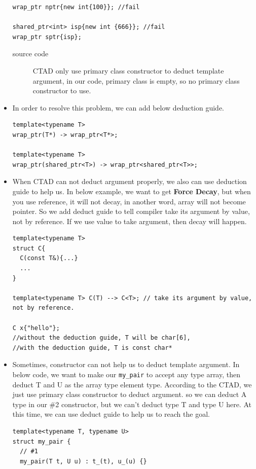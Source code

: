 \documentclass[a4paper,11pt,twoside]{book}
\begin{document}
\begin{itemize}
\begin{lstlisting}
wrap_ptr nptr{new int{100}}; //fail

shared_ptr<int> isp{new int {666}}; //fail
wrap_ptr sptr{isp};
\end{lstlisting}

\begin{description}
    \item[source code] CTAD only use primary class constructor to deduct template argument, in our code, primary class is empty, so no primary class constructor to use.
\end{description}

    \item In order to resolve this problem, we can add below deduction guide.

\begin{lstlisting}
template<typename T>
wrap_ptr(T*) -> wrap_ptr<T*>;

template<typename T>
wrap_ptr(shared_ptr<T>) -> wrap_ptr<shared_ptr<T>>;
\end{lstlisting}


        \item When CTAD can not deduct argument properly, we also can use deduction guide to help us. In below example, we want to get \textbf{Force Decay}, but when you use reference, it will not decay, in another word, array will not become pointer. So we add deduct guide to tell compiler take its argument by value, not by reference. If we use value to take argument, then decay will happen.
\begin{lstlisting}
template<typename T>
struct C{
  C(const T&){...}
  ...
}

template<typename T> C(T) --> C<T>; // take its argument by value, not by reference.

C x{"hello"};
//without the deduction guide, T will be char[6],
//with the deduction guide, T is const char*
\end{lstlisting}

    \item Sometimes, constructor can not help us to deduct template argument. In below code, we want to make our \texttt{my\_pair} to accept any type array, then deduct T and U as the array type element type. According to the CTAD, we just use primary class constructor to deduct argument. so we can deduct A type in our \#2 constructor, but we can't deduct type T and type U here. At this time, we can use deduct guide to help us to reach the goal. 

\begin{lstlisting}
template<typename T, typename U>
struct my_pair {
  // #1
  my_pair(T t, U u) : t_(t), u_(u) {}
  

\end{lstlisting}
\end{itemize}
\end{document}
